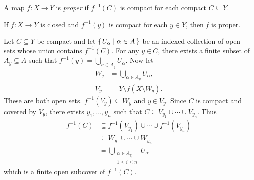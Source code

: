 \documentclass[letterpaper, 11pt, oneside]{book}
\begin{document}
\begin{defn}
  A map $f\colon X \to Y$ is \emph{proper} if $f^{-1}(C)$ is compact for each compact $C \subseteq Y$.
\end{defn}

\begin{thrm}\label{thrm: closed_single_point_preimage_compact}
  If $f\colon X \to Y$ is closed and $f^{-1}(y)$ is compact for each $y \in Y$, then $f$ is proper.
\end{thrm}
\begin{pf}
  Let $C \subseteq Y$ be compact and let $\set{U_{\alpha} | \alpha \in A}$ be an indexed collection of open sets whose union contains $f^{-1}(C)$.
  For any $y \in C$, there exists a finite subset of $A_{y} \subseteq A$ such that $f^{-1}(y) = \bigcup_{\alpha \in A_{y}} U_{\alpha}$.
  Now let
  \begin{align*}
    W_{y} &= \bigcup_{\alpha \in A_{y}} U_{\alpha}, \\
    V_{y} &= Y \setminus f(X \setminus W_{y}).
  \end{align*}
  These are both open sets.
  $f^{-1}(V_{y}) \subseteq W_{y}$ and $y \in V_{y}$.
  Since $C$ is compact and covered by $V_{y}$, there exists $y_{1}, \ldots, y_{n}$ such that $C \subseteq V_{y_{1}} \cup \cdots \cup V_{y_{n}}$.
  Thus
  \begin{align*}
    f^{-1}(C) &\subseteq f^{-1}(V_{y_{1}}) \cup \cdots \cup f^{-1}(V_{y_{n}}) \\
              &\subseteq W_{y_{1}} \cup \cdots \cup W_{y_{n}} \\
              &= \bigcup_{\substack{\alpha \in A_{y_{i}} \\ 1 \leq i \leq n}} U_{\alpha}
  \end{align*}
  which is a finite open subcover of $f^{-1}(C)$.
\end{pf}

\clearpage
\end{document}
